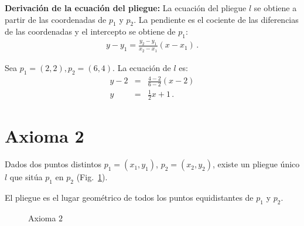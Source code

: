 \noindent\textbf{Derivación de la ecuación del pliegue:}
La ecuación del pliegue $l$ se obtiene a partir de las coordenadas de $p_1$ y $p_2$. La pendiente es el cociente de las diferencias de las coordenadas y el intercepto se obtiene de $p_1$:
\begin{align}
y - y_1 = \frac{y_2-y_1}{x_2-x_1}(x-x_1)\,.
\end{align}

\begin{example}
Sea $p_1=(2,2), p_2=(6,4)$. La ecuación de $l$ es:
\begin{eqnarray*}
y-2&=&\frac{4-2}{6-2}(x-2)\\
y&=&\frac{1}{2}x+1\,.
\end{eqnarray*}
\end{example}



\section{Axioma 2}\label{s.ax2}

\begin{axiom}
Dados dos puntos distintos $p_1=(x_1,y_1)$, $p_2=(x_2,y_2)$, existe un pliegue único $l$ que sitúa $p_1$ en $p_2$ (Fig.~\ref{f.origami-axiom2}).
\end{axiom}

El pliegue es el lugar geométrico de todos los puntos equidistantes de $p_1$ y $p_2$.

\begin{figure}[ht]
\begin{center}
\end{center}
\caption{Axioma $2$}\label{f.origami-axiom2}
\end{figure}

